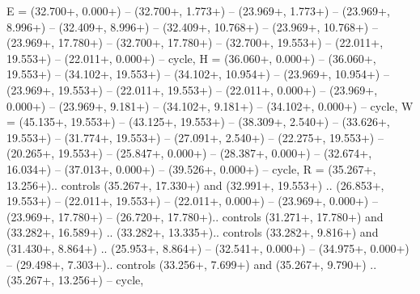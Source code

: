{E} = {(32.700+\ctpXshift, 0.000+\ctpYshift) -- (32.700+\ctpXshift, 1.773+\ctpYshift) -- (23.969+\ctpXshift, 1.773+\ctpYshift) -- (23.969+\ctpXshift, 8.996+\ctpYshift) -- (32.409+\ctpXshift, 8.996+\ctpYshift) -- (32.409+\ctpXshift, 10.768+\ctpYshift) -- (23.969+\ctpXshift, 10.768+\ctpYshift) -- (23.969+\ctpXshift, 17.780+\ctpYshift) -- (32.700+\ctpXshift, 17.780+\ctpYshift) -- (32.700+\ctpXshift, 19.553+\ctpYshift) -- (22.011+\ctpXshift, 19.553+\ctpYshift) -- (22.011+\ctpXshift, 0.000+\ctpYshift) -- cycle},
{H} = {(36.060+\ctpXshift, 0.000+\ctpYshift) -- (36.060+\ctpXshift, 19.553+\ctpYshift) -- (34.102+\ctpXshift, 19.553+\ctpYshift) -- (34.102+\ctpXshift, 10.954+\ctpYshift) -- (23.969+\ctpXshift, 10.954+\ctpYshift) -- (23.969+\ctpXshift, 19.553+\ctpYshift) -- (22.011+\ctpXshift, 19.553+\ctpYshift) -- (22.011+\ctpXshift, 0.000+\ctpYshift) -- (23.969+\ctpXshift, 0.000+\ctpYshift) -- (23.969+\ctpXshift, 9.181+\ctpYshift) -- (34.102+\ctpXshift, 9.181+\ctpYshift) -- (34.102+\ctpXshift, 0.000+\ctpYshift) -- cycle},
{W} = {(45.135+\ctpXshift, 19.553+\ctpYshift) -- (43.125+\ctpXshift, 19.553+\ctpYshift) -- (38.309+\ctpXshift, 2.540+\ctpYshift) -- (33.626+\ctpXshift, 19.553+\ctpYshift) -- (31.774+\ctpXshift, 19.553+\ctpYshift) -- (27.091+\ctpXshift, 2.540+\ctpYshift) -- (22.275+\ctpXshift, 19.553+\ctpYshift) -- (20.265+\ctpXshift, 19.553+\ctpYshift) -- (25.847+\ctpXshift, 0.000+\ctpYshift) -- (28.387+\ctpXshift, 0.000+\ctpYshift) -- (32.674+\ctpXshift, 16.034+\ctpYshift) -- (37.013+\ctpXshift, 0.000+\ctpYshift) -- (39.526+\ctpXshift, 0.000+\ctpYshift) -- cycle},
{R} = {(35.267+\ctpXshift, 13.256+\ctpYshift).. controls (35.267+\ctpXshift, 17.330+\ctpYshift) and (32.991+\ctpXshift, 19.553+\ctpYshift) .. (26.853+\ctpXshift, 19.553+\ctpYshift) -- (22.011+\ctpXshift, 19.553+\ctpYshift) -- (22.011+\ctpXshift, 0.000+\ctpYshift) -- (23.969+\ctpXshift, 0.000+\ctpYshift) -- (23.969+\ctpXshift, 17.780+\ctpYshift) -- (26.720+\ctpXshift, 17.780+\ctpYshift).. controls (31.271+\ctpXshift, 17.780+\ctpYshift) and (33.282+\ctpXshift, 16.589+\ctpYshift) .. (33.282+\ctpXshift, 13.335+\ctpYshift).. controls (33.282+\ctpXshift, 9.816+\ctpYshift) and (31.430+\ctpXshift, 8.864+\ctpYshift) .. (25.953+\ctpXshift, 8.864+\ctpYshift) -- (32.541+\ctpXshift, 0.000+\ctpYshift) -- (34.975+\ctpXshift, 0.000+\ctpYshift) -- (29.498+\ctpXshift, 7.303+\ctpYshift).. controls (33.256+\ctpXshift, 7.699+\ctpYshift) and (35.267+\ctpXshift, 9.790+\ctpYshift) .. (35.267+\ctpXshift, 13.256+\ctpYshift) -- cycle},
